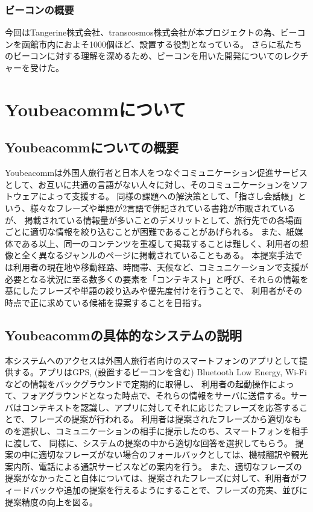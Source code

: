 \documentclass[12pt,papersize]{jsbook}
\begin{document}
\subsection{ビーコンの概要}
 今回はTangerine株式会社、transcosmos株式会社が本プロジェクトの為、ビーコンを函館市内におよそ1000個ほど、設置する役割となっている。
さらに私たちのビーコンに対する理解を深めるため、ビーコンを用いた開発についてのレクチャーを受けた。



\chapter{Youbeacommについて}
\section{Youbeacommについての概要}
 Youbeacommは外国人旅行者と日本人をつなぐコミュニケーション促進サービスとして、お互いに共通の言語がない人々に対し、そのコミュニケーションをソフトウェアによって支援する。
同様の課題への解決策として、「指さし会話帳」という、様々なフレーズや単語が2言語で併記されている書籍が市販されているが、
掲載されている情報量が多いことのデメリットとして、旅行先での各場面ごとに適切な情報を絞り込むことが困難であることがあげられる。
また、紙媒体である以上、同一のコンテンツを重複して掲載することは難しく、利用者の想像と全く異なるジャンルのページに掲載されていることもある。
本提案手法では利用者の現在地や移動経路、時間帯、天候など、コミュニケーションで支援が必要となる状況に至る数多くの要素を「コンテキスト」と呼び、それらの情報を基にしたフレーズや単語の絞り込みや優先度付けを行うことで、
利用者がその時点で正に求めている候補を提案することを目指す。
\section{Youbeacommの具体的なシステムの説明}
 本システムへのアクセスは外国人旅行者向けのスマートフォンのアプリとして提供する。アプリはGPS, (設置するビーコンを含む) Bluetooth Low Energy, Wi-Fiなどの情報をバックグラウンドで定期的に取得し、
利用者の起動操作によって、フォアグラウンドとなった時点で、それらの情報をサーバに送信する。サーバはコンテキストを認識し、アプリに対してそれに応じたフレーズを応答することで、フレーズの提案が行われる。
利用者は提案されたフレーズから適切なものを選択し、コミュニケーションの相手に提示したのち、スマートフォンを相手に渡して、
同様に、システムの提案の中から適切な回答を選択してもらう。
提案の中に適切なフレーズがない場合のフォールバックとしては、機械翻訳や観光案内所、電話による通訳サービスなどの案内を行う。
また、適切なフレーズの提案がなかったこと自体については、提案されたフレーズに対して、利用者がフィードバックや追加の提案を行えるようにすることで、フレーズの充実、並びに提案精度の向上を図る。
\end{document}
